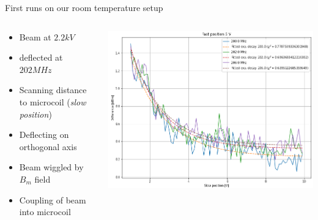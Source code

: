 \documentclass[final]{beamer}
\begin{document}
\begin{frame}[fragile]{}
\begin{columns}[T]
\begin{column}{.49\linewidth}
      \begin{block}{\Large First runs on our room temperature setup}
        \begin{columns}
          \begin{column}{0.4\columnwidth}
            \begin{itemize}
                \item Beam at $2.2 kV$
                \item deflected at $202 MHz$
                \item Scanning distance to microcoil (\textit{slow position})
                \item Deflecting on orthogonal axis
                \item Beam wiggled by $B_m$ field
                \item Coupling of beam into microcoil
            \end{itemize}
          \end{column}
          \begin{column}{0.6\columnwidth}
            \includegraphics[width=\columnwidth]{figures/beamcoupling.png}
          \end{column}
        \end{columns}
      \end{block}


\end{column}
\end{columns}
\end{frame}
\end{document}

